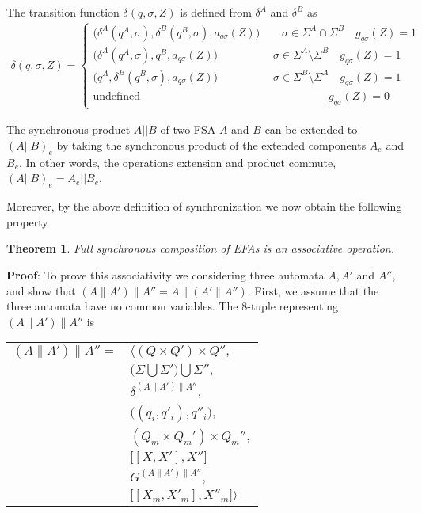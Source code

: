 \documentclass{article}
\newtheorem{theorem}{Theorem}
\begin{document}
 The transition function
$\delta(q,\sigma,Z)$ is defined from $\delta^A$ and $\delta^B$ as
\begin{eqnarray}
\delta(q,\sigma,Z)=\left\{
\begin{array}{ll}
\big(\delta^A(q^A,\sigma),\delta^B(q^B,\sigma),a_{q \sigma}(Z)\big) \quad\quad \sigma\in \Sigma^A \cap \Sigma^B \quad g_{q \sigma}(Z)=1\\
\big(\delta^A(q^A,\sigma),q^B,a_{q \sigma}(Z)\big) \quad\quad\quad\quad\quad \sigma\in \Sigma^A \setminus \Sigma^B \quad g_{q \sigma}(Z)=1\\
\big(q^A,\delta^B(q^B,\sigma),a_{q \sigma}(Z)\big) \quad\quad\quad\quad\quad \sigma\in \Sigma^B \setminus \Sigma^A \quad g_{q \sigma}(Z)=1\\
\textrm{
undefined}\quad\quad\quad\quad\quad\quad\quad\quad\quad\quad\quad\quad\quad\quad\quad\quad\quad
g_{q\sigma}(Z)=0
\end{array}\right.
\end{eqnarray}

The synchronous product $A||B$ of two FSA $A$ and $B$ can be
extended to $(A||B)_e$ by taking the synchronous product of the
extended components  $A_e$ and $B_e$. In other words, the
operations extension and product commute, $(A||B)_e=A_e||B_e$.

Moreover, by the above definition of synchronization we now obtain
the following property

\begin{theorem}
   Full synchronous composition of EFAs is an associative
   operation.
\end{theorem}

\noindent \textbf{Proof}: To prove this associativity we
considering three automata $A, A'$ and $A''$, and show that
$(A\|A')\|A'' = A\|(A'\|A'')$. First, we assume that the three
automata have no common variables.
\newline\newline
\noindent The 8-tuple representing $(A\|A')\|A''$ is
\begin{center}
\begin{tabular}{ll}
  $(A\|A')\|A'' =$ & $\Big \langle (Q \times Q') \times Q'',$\\
  & $ \big(\Sigma \bigcup \Sigma' \big) \bigcup \Sigma'',$\\
  & $\delta^{(A\|A')\|A''},$\\
  & $\big((q_i, q'_i) , q''_i\big),$\\
  & $(Q_m \times Q_m') \times Q_m'',$\\
  & $\big[[X, X'], X'']$\\
  & $G^{(A\|A')\|A''},$\\
  & $\big[[X_m, X'_m], X''_m \big] \Big \rangle$
\end{tabular}
\end{center}
\end{document}

